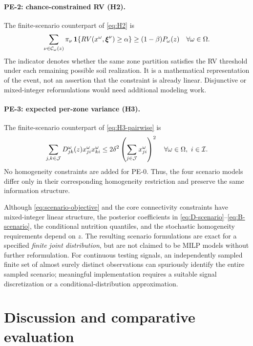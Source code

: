 \paragraph{PE-2: chance-constrained RV (H2).}
The finite-scenario counterpart of \eqref{eq:H2} is
\begin{equation}
 \sum_{\nu\in\mathcal C_\omega(z)}
  \pi_\nu\,\mathbf{1}\!\left\{
       RV(x^\omega,\boldsymbol\xi^\nu)\geq\alpha
     \right\}
 \geq(1-\beta)P_\omega(z)
 \quad\forall\omega\in\Omega.
 \label{eq:H2-scenario}
\end{equation}
The indicator denotes whether the same zone partition satisfies the
RV threshold under each remaining possible soil realization. It is a
mathematical representation of the event, not an assertion that the
constraint is already linear. Disjunctive or mixed-integer
reformulations would need additional modeling work.

\paragraph{PE-3: expected per-zone variance (H3).}
The finite-scenario counterpart of \eqref{eq:H3-pairwise} is
\begin{equation}
 \sum_{j,k\in\mathcal{J}}D_{jk}^\omega(z)
     x_{ji}^\omega x_{ki}^\omega
 \leq2\delta^2\left(\sum_{j\in\mathcal{J}}x_{ji}^\omega\right)^2
 \quad\forall\omega\in\Omega,\ i\in\mathcal{I}.
 \label{eq:H3-scenario}
\end{equation}
No homogeneity constraints are added for PE-0. Thus, the four
scenario models differ only in their corresponding homogeneity
restriction and preserve the same information structure.

Although \eqref{eq:scenario-objective} and the core connectivity
constraints have mixed-integer linear structure, the posterior
coefficients in \eqref{eq:D-scenario}--\eqref{eq:B-scenario}, the
conditional nutrition quantiles, and the stochastic homogeneity
requirements depend on $z$. The resulting scenario formulations are
exact for a specified \emph{finite joint distribution}, but are not
claimed to be MILP models without further reformulation. For
continuous testing signals, an independently sampled finite set of
almost surely distinct observations can spuriously identify the
entire sampled scenario; meaningful implementation requires a suitable
signal discretization or a conditional-distribution approximation.

\section{Discussion and comparative evaluation}
\label{sec:discussion}

